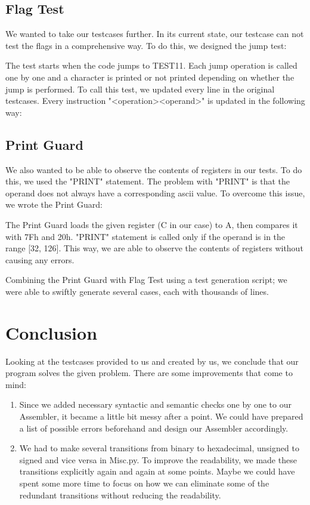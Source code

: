 \documentclass[12pt,a4paper]{article}
\begin{document}
\subsection{Flag Test}

We wanted to take our testcases further. In its current state, our testcase can not test the flags in a comprehensive way. To do this, we designed the jump test:



The test starts when the code jumps to TEST11. Each jump operation is called one by one and a character is printed or not printed depending on whether the jump is performed. To call this test, we updated every line in the original testcases. Every instruction "\textless operation\textgreater  \textless operand\textgreater" is updated in the following way:



\subsection{Print Guard}

We also wanted to be able to observe the contents of registers in our tests. To do this, we used the "PRINT" statement. The problem with "PRINT" is that the operand does not always have a corresponding ascii value. To overcome this issue, we wrote the Print Guard:



The Print Guard loads the given register (C in our case) to A, then compares it with 7Fh and 20h. "PRINT" statement is called only if the operand is in the range [32, 126]. This way, we are able to observe the contents of registers without causing any errors.

Combining the Print Guard with Flag Test using a test generation script; we were able to swiftly generate several cases, each with thousands of lines.

\section{Conclusion}

Looking at the testcases provided to us and created by us, we conclude that our program solves the given problem. There are some improvements that come to mind:
\begin{enumerate}
	\item Since we added necessary syntactic and semantic checks one by one to our Assembler, it became a little bit messy after a point. We could have prepared a list of possible errors beforehand and design our Assembler accordingly.
	\item We had to make several transitions from binary to hexadecimal, unsigned to signed and vice versa in Misc.py. To improve the readability, we made these transitions explicitly again and again at some points. Maybe we could have spent some more time to focus on how we can eliminate some of the redundant transitions without reducing the readability. 
\end{enumerate}
\end{document}
